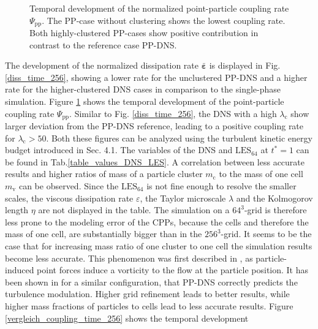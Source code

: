 \documentclass[11pt,a4paper,openany,oneside,parskip=half*]{article}
\renewcommand*\vec[1]{\boldsymbol{#1}}
\begin{document}
\begin{figure}[htb]
\begin{minipage}[]{0.5\textwidth}
        \caption{Temporal development of the normalized point-particle coupling rate $\Psi_\mathrm{pp}$. The PP-case without clustering shows the lowest coupling rate. Both highly-clustered PP-cases show positive contribution in contrast to the reference case PP-DNS.}
        \label{coupling_time_256}
    \end{minipage}
\end{figure}%
The development of the normalized dissipation rate $\bar{\vec{\varepsilon}}$ is displayed in Fig. \ref{diss_time_256}, showing a lower rate for the unclustered PP-DNS and a higher rate for the higher-clustered DNS cases in comparison to the single-phase simulation.
\newline %
Figure \ref{coupling_time_256} shows the temporal development of the point-particle coupling rate $\Psi_\mathrm{pp}$. Similar to Fig. \ref{diss_time_256}, the DNS with a high $\lambda_\mathrm{c}$ show larger deviation from the PP-DNS reference, leading to a positive coupling rate for $\lambda_\mathrm{c} > 50$.
Both these figures can be analyzed using the turbulent kinetic energy budget introduced in Sec. 4.1.
\newline
The variables of the DNS and $\mathrm{LES_{64}}$ at $t^* = 1$ can be found in Tab.\ref{table_values_DNS_LES}. A correlation between less accurate results and higher ratios of mass of a particle cluster $m_\mathrm{c}$ to the mass of one cell $m_\mathrm{v}$ can be observed. Since the $\mathrm{LES_{64}}$ is not fine enough to resolve the smaller scales, the viscous dissipation rate $\varepsilon$, the Taylor microscale $\lambda$ and the Kolmogorov length $\eta$ are not displayed in the table. The simulation on a $64^3$-grid is therefore less prone to the modeling error of the CPPs, because the cells and therefore the mass of one cell, are substantially bigger than in the $256^3$-grid. 
It seems to be the case that for increasing mass ratio of one cluster to one cell the simulation results become less accurate. This phenomenon was first described in \cite{maxey1997simulations}, as particle-induced point forces induce a vorticity to the flow at the particle position. 
\newline
It has been shown in \cite{boivin_simonin_squires_1998} for a similar configuration, that PP-DNS correctly predicts the turbulence modulation. Higher grid refinement leads to better results, while higher mass fractions of particles to cells lead to less accurate results. 
Figure \ref{vergleich_coupling_time_256} shows the temporal development 
\end{document}
